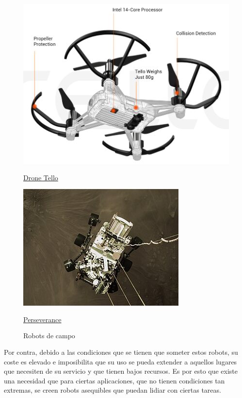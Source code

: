 \begin{figure}[ht!]
\begin{minipage}{0.3\linewidth}
		\includegraphics[width=\linewidth]{figs/tello.png}
		\caption*{\centering\href{https://www.ryzerobotics.com/es/tello}{Drone Tello}}
	\end{minipage}
	\hspace{3cm}
	\begin{minipage}{0.3\linewidth}
		\centering
		\includegraphics[width=\linewidth]{figs/perseverance.jpg}
		\caption*{\centering\href{https://es.wikipedia.org/wiki/Perseverance}{Perseverance}}
	\end{minipage}
	\caption{Robots de campo}
	\label{fig:robcampo}
\end{figure}

Por contra, debido a las condiciones que se tienen que someter estos robots, su coste es elevado e imposibilita que su uso se pueda extender a aquellos lugares que necesiten de su servicio y que tienen bajos recursos. Es por esto que existe una necesidad que para ciertas aplicaciones, que no tienen condiciones tan extremas, se creen robots asequibles que puedan lidiar con ciertas tareas. \\

